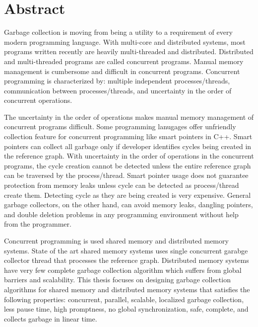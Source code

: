 \chapter*{Abstract}
\label{ch:abstract}
Garbage collection is moving from being a utility to a requirement of every modern programming language. 
With multi-core and distributed systems, most programs written recently are heavily multi-threaded and distributed. Distributed and multi-threaded programs are called concurrent programs. Manual memory management is cumbersome and difficult in concurrent programs.  Concurrent programming is characterized by: multiple independent processes/threads, communication between processes/threads, and uncertainty in the order of concurrent operations.

The uncertainty in the order of operations makes manual memory management of concurrent programs difficult. Some programming lanugages offer unfriendly collection feature for concurrent programming like smart pointers in C++.
Smart pointers can collect all garbage only if developer identifies cycles being created in the reference graph. With uncertainty in the order of operations in the concurrent programs, the cycle creation cannot be detected unless the entire reference graph can be traversed by the process/thread.
Smart pointer usage does not guarantee protection from memory leaks unless cycle can be detected as process/thread create them. Detecting cycle as they are being created is very expensive.
General garbage collectors, on the other hand, can avoid memory leaks, dangling pointers, and double deletion problems in any programming environment without help from the programmer.

Concurrent programming is used shared memory and distributed memory systems. State of the art shared memory systems uses single concurrent garabge collector thread that processes the reference graph. Distributed memory systems have very few complete garbage collection algorithm which suffers from global barriers and scalability. This thesis  focuses on designing garbage collection algorithms for shared memory and distributed memory systems that satisfies the following properties: concurrent, parallel, scalable, localized garbage collection, less pause time, high promptness, no global synchronization, safe, complete, and collects garbage in linear time.

